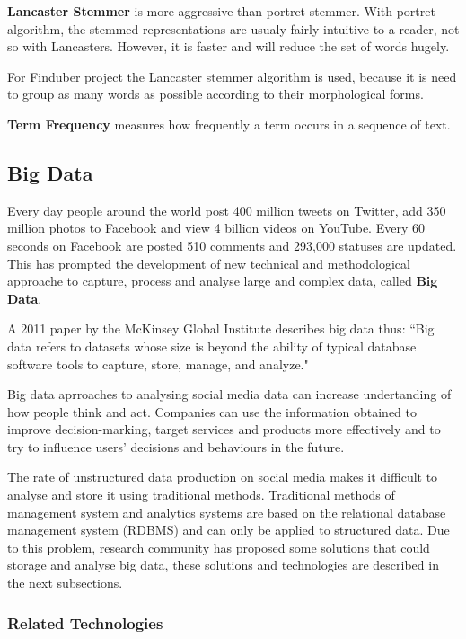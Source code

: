 \textbf{Lancaster Stemmer} is more aggressive than portret stemmer. With portret algorithm, the stemmed representations are usualy fairly intuitive to a reader, not so with Lancasters. However, it is faster and will reduce the set of words hugely. 

For Finduber project the Lancaster stemmer algorithm is used, because it is need to group as many words as possible according to their morphological forms.

\textbf{Term Frequency} measures how frequently a term occurs in a sequence of text.

\subsection{Big Data}

Every day people around the world post 400 million tweets on Twitter, add 350 million photos to Facebook and view 4 billion videos on YouTube.\cite{digitalInfo} Every 60 seconds on Facebook are posted 510 comments and 293,000 statuses are updated.\cite{zephoria} This has prompted the development of new technical and methodological approache to capture, process and analyse large and complex data, called \textbf{Big Data}. 

A 2011 paper by the McKinsey Global Institute describes big data thus: ``Big data refers to datasets whose size is beyond the ability of typical database software tools to capture, store, manage, and analyze."\cite{bigdata} 

Big data aprroaches to analysing social media data can increase undertanding of how people think and act. Companies can use the information obtained to improve decision-marking, target services and products more effectively and to try to influence users' decisions and behaviours in the future.\cite{POSTNOTE460}

The rate of unstructured data production on social media makes it difficult to analyse and store it using traditional methods. Traditional methods of management system and analytics systems are based on the relational database management system (RDBMS) and can only be applied to structured data.\cite{bdtech} Due to this problem, research community has proposed some solutions that could storage and analyse big data, these solutions and technologies are described in the next subsections.

\subsubsection{Related Technologies}

